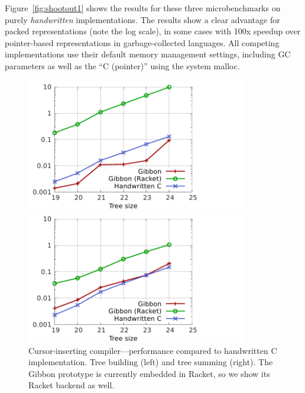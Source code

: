 \documentclass[a4paper,english]{lipics-v2016}
\begin{document}
Figure~\ref{fig:shootout1} shows the results for these three microbenchmarks on
purely {\em handwritten} implementations. The results show a clear advantage for
packed representations (note the log scale), in some cases with 100x speedup
over pointer-based representations in garbage-collected languages.  All
competing implementations use their default memory management settings,
including GC parameters as well as the ``C (pointer)'' using the system malloc.

\begin{figure}[t]
\hspace{-6mm}  
\begin{minipage}{1.00\textwidth}
  \begin{minipage}{.49\textwidth}
    \centering
    \includegraphics[width=3.8in]{./figs/shootout_gibbon_buildtree.pdf}
  \end{minipage}
  \hspace{0.03\textwidth}
  \begin{minipage}{.49\textwidth}
    \centering
    \includegraphics[width=3.8in]{./figs/shootout_gibbon_sumtree.pdf}
  \end{minipage}
\end{minipage}
   \caption{Cursor-inserting compiler---performance compared to handwritten C
     implementation.  Tree building (left) and tree summing (right). The Gibbon
     prototype is currently embedded in Racket, so we show its Racket backend as
   well.}
   \label{fig:shootout2}
\end{figure}
\end{document}
